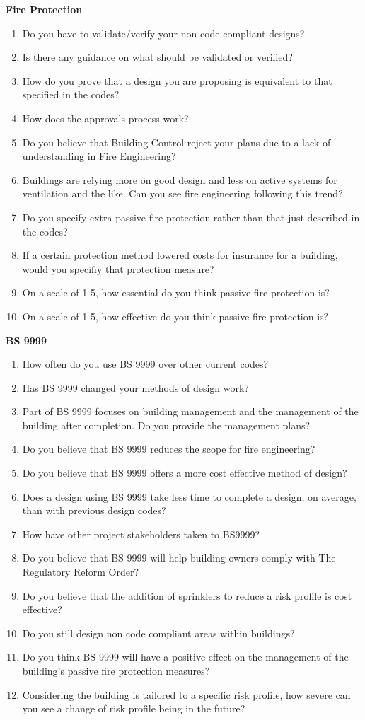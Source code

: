 \textbf{Fire Protection}
\begin{enumerate}
\item Do you have to validate/verify your non code compliant designs?
\item Is there any guidance on what should be validated or verified?
\item How do you prove that a design you are proposing is equivalent to that specified in the codes?
\item How does the approvals process work?
\item Do you believe that Building Control reject your plans due to a lack of understanding in Fire Engineering?
\item Buildings are relying more on good design and less on active systems for ventilation and the like. Can you see fire engineering following this trend?
\item Do you specify extra passive fire protection rather than that just described in the codes?
\item If a certain protection method lowered costs for insurance for a building, would you specifiy that protection measure?
\item On a scale of 1-5, how essential do you think passive fire protection is?
\item On a scale of 1-5, how effective do you think passive fire protection is?
\end{enumerate}

\textbf{BS 9999}
\begin{enumerate}
\item How often do you use BS 9999 over other current codes?
\item Has BS 9999 changed your methods of design work?
\item Part of BS 9999 focuses on building management and the management of the building after completion. Do you provide the management plans?
\item Do you believe that BS 9999 reduces the scope for fire engineering?
\item Do you believe that BS 9999 offers a more cost effective method of design?
\item Does a design using BS 9999 take less time to complete a design, on average, than with previous design codes?
\item How have other project stakeholders taken to BS9999?
\item Do you believe that BS 9999 will help building owners comply with The Regulatory Reform Order?
\item Do you believe that the addition of sprinklers to reduce a risk profile is cost effective?
\item Do you still design non code compliant areas within buildings?
\item Do you think BS 9999 will have a positive effect on the management of the building's passive fire protection measures?
\item Considering the building is tailored to a specific risk profile, how severe can you see a change of risk profile being in the future?
\end{enumerate}
